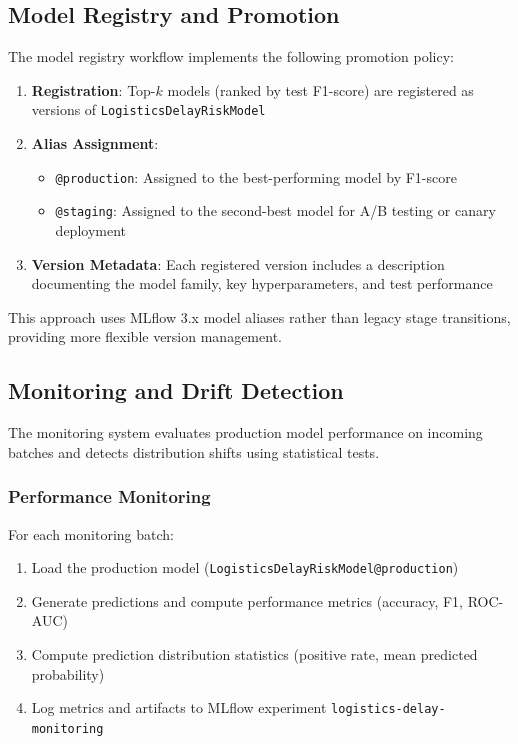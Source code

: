 \documentclass[11pt,a4paper]{article}
\begin{document}
\subsection{Model Registry and Promotion}

The model registry workflow implements the following promotion policy:

\begin{enumerate}
    \item \textbf{Registration}: Top-$k$ models (ranked by test F1-score) are registered as versions of \texttt{LogisticsDelayRiskModel}
    \item \textbf{Alias Assignment}:
    \begin{itemize}
        \item \texttt{@production}: Assigned to the best-performing model by F1-score
        \item \texttt{@staging}: Assigned to the second-best model for A/B testing or canary deployment
    \end{itemize}
    \item \textbf{Version Metadata}: Each registered version includes a description documenting the model family, key hyperparameters, and test performance
\end{enumerate}

This approach uses MLflow 3.x model aliases rather than legacy stage transitions, providing more flexible version management.

\subsection{Monitoring and Drift Detection}

The monitoring system evaluates production model performance on incoming batches and detects distribution shifts using statistical tests.

\subsubsection{Performance Monitoring}

For each monitoring batch:
\begin{enumerate}
    \item Load the production model (\texttt{LogisticsDelayRiskModel@production})
    \item Generate predictions and compute performance metrics (accuracy, F1, ROC-AUC)
    \item Compute prediction distribution statistics (positive rate, mean predicted probability)
    \item Log metrics and artifacts to MLflow experiment \texttt{logistics-delay-monitoring}
\end{enumerate}
\end{document}
